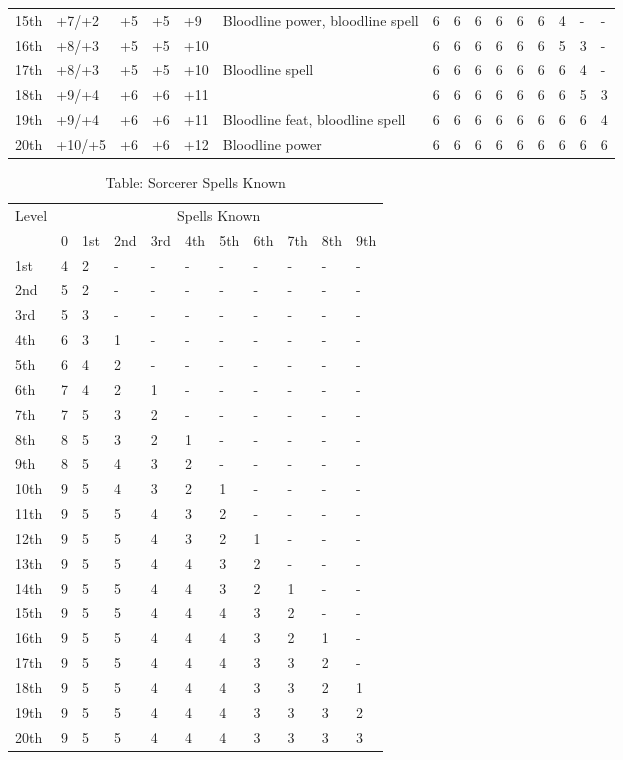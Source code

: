 \begin{table*}[]
\begin{tabularx}{\linewidth}{lp{6em}p{2.5em}p{2.5em}p{2.5em}Xlllllllll}
15th & +7/+2 & +5 & +5 & +9 & Bloodline power, bloodline spell & 6 & 6 & 6 & 6 & 6 & 6 & 4 & - & -\\
16th & +8/+3 & +5 & +5 & +10 &  & 6 & 6 & 6 & 6 & 6 & 6 & 5 & 3 & -\\
17th & +8/+3 & +5 & +5 & +10 & Bloodline spell & 6 & 6 & 6 & 6 & 6 & 6 & 6 & 4 & -\\
18th & +9/+4 & +6 & +6 & +11 &  & 6 & 6 & 6 & 6 & 6 & 6 & 6 & 5 & 3\\
19th & +9/+4 & +6 & +6 & +11 & Bloodline feat, bloodline spell & 6 & 6 & 6 & 6 & 6 & 6 & 6 & 6 & 4\\
20th & +10/+5 & +6 & +6 & +12 & Bloodline power & 6 & 6 & 6 & 6 & 6 & 6 & 6 & 6 & 6\\
\end{tabularx}
\end{table*}

\begin{table}[]
\caption{Table: Sorcerer Spells Known}
\sffamily
\setlength{\tabcolsep}{1pt}
\begin{tabular}{lllllllllll}
Level & \multicolumn{10}{c}{Spells Known}\\
      & 0 & 1st & 2nd & 3rd & 4th & 5th & 6th & 7th & 8th & 9th\\
1st & 4 & 2 & - & - & - & - & - & - & - & -\\
2nd & 5 & 2 & - & - & - & - & - & - & - & -\\
3rd & 5 & 3 & - & - & - & - & - & - & - & -\\
4th & 6 & 3 & 1 & - & - & - & - & - & - & -\\
5th & 6 & 4 & 2 & - & - & - & - & - & - & -\\
6th & 7 & 4 & 2 & 1 & - & - & - & - & - & -\\
7th & 7 & 5 & 3 & 2 & - & - & - & - & - & -\\
8th & 8 & 5 & 3 & 2 & 1 & - & - & - & - & -\\
9th & 8 & 5 & 4 & 3 & 2 & - & - & - & - & -\\
10th & 9 & 5 & 4 & 3 & 2 & 1 & - & - & - & -\\
11th & 9 & 5 & 5 & 4 & 3 & 2 & - & - & - & -\\
12th & 9 & 5 & 5 & 4 & 3 & 2 & 1 & - & - & -\\
13th & 9 & 5 & 5 & 4 & 4 & 3 & 2 & - & - & -\\
14th & 9 & 5 & 5 & 4 & 4 & 3 & 2 & 1 & - & -\\
15th & 9 & 5 & 5 & 4 & 4 & 4 & 3 & 2 & - & -\\
16th & 9 & 5 & 5 & 4 & 4 & 4 & 3 & 2 & 1 & -\\
17th & 9 & 5 & 5 & 4 & 4 & 4 & 3 & 3 & 2 & -\\
18th & 9 & 5 & 5 & 4 & 4 & 4 & 3 & 3 & 2 & 1\\
19th & 9 & 5 & 5 & 4 & 4 & 4 & 3 & 3 & 3 & 2\\
20th & 9 & 5 & 5 & 4 & 4 & 4 & 3 & 3 & 3 & 3\\
\end{tabular}
\end{table}

